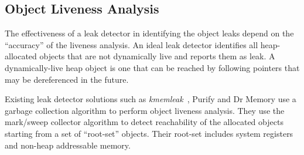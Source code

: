 

\subsection{Object Liveness Analysis}\label{sec:object_liveness}
The effectiveness of a leak detector in identifying the object leaks depend on the ``accuracy'' of the liveness analysis. An ideal leak detector identifies all heap-allocated objects that are not dynamically live and reports them as leak. A dynamically-live heap object is one that can be reached by following pointers that may be dereferenced in the future. 

Existing leak detector solutions such as \emph{kmemleak}~\cite{kmemleak}, Purify \cite{Rs_purify:fast} and Dr Memory \cite{Bruening:2011:PMC:2190025.2190067} use a garbage collection algorithm to perform object liveness analysis. They use the mark/sweep collector algorithm \cite{Boehm:1991:MPG:113445.113459} to detect reachability of the allocated objects starting from a set of ``root-set'' objects. Their root-set includes system registers and non-heap addressable memory. 


